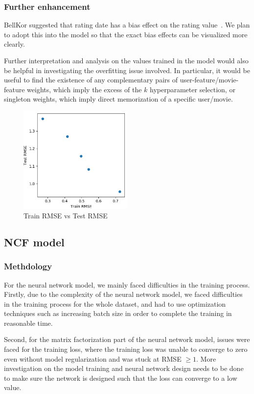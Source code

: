 \documentclass[final]{cvpr}
\begin{document}
\subsubsection{Further enhancement}
BellKor suggested that rating date has a bias effect on the rating value~\cite{BellKor2008}.
We plan to adopt this into the model so that
the exact bias effects can be visualized more clearly.

Further interpretation and analysis on the values trained in the model
would also be helpful in investigating the overfitting issue involved.
In particular, it would be useful to find the existence of
any complementary pairs of user-feature/movie-feature weights,
which imply the excess of the $k$ hyperparameter selection,
or singleton weights,
which imply direct memorization of a specific user/movie.

\begin{figure}
	\includegraphics[width=0.5\textwidth]{screenshot20210422225123.png}
	\caption{Train RMSE vs Test RMSE}
	\label{fig:svd-rmse-scatter}
\end{figure}

\subsection{\ac{NCF} model}
\subsubsection{Methdology}
For the neural network model, we mainly faced difficulties in the training process.
Firstly, due to the complexity of the neural network model,
we faced difficulties in the training process for the whole dataset,
and had to use optimization techniques such as increasing batch size in order to complete the training in reasonable time.

Second, for the matrix factorization part of the neural network model,
issues were faced for the training loss,
where the training loss was unable to converge to zero even without model regularization and was stuck at RMSE $\ge 1$.
More investigation on the model training and neural network design needs to be done
to make sure the network is designed such that the loss can converge to a low value.
\end{document}
